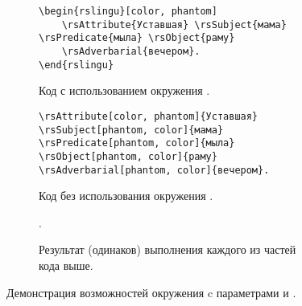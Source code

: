\begin{figure}[htp!]
    \centering
    \begin{subfigure}{\textwidth}
        \begin{verbatim}
\begin{rslingu}[color, phantom]
    \rsAttribute{Уставшая} \rsSubject{мама} \rsPredicate{мыла} \rsObject{раму}
    \rsAdverbarial{вечером}.
\end{rslingu}
        \end{verbatim}
    \caption{Код с использованием окружения .}
    \end{subfigure}\vspace*{.75cm}
    \begin{subfigure}{\textwidth}
        \begin{verbatim}
\rsAttribute[color, phantom]{Уставшая} \rsSubject[phantom, color]{мама}
\rsPredicate[phantom, color]{мыла} \rsObject[phantom, color]{раму}
\rsAdverbarial[phantom, color]{вечером}.
        \end{verbatim}
    \caption{Код без использования окружения .}
    \end{subfigure}\vspace*{.75cm}
    \begin{subfigure}{.9\textwidth}
        \centering
        \begin{rslingu}
                .
        \end{rslingu}
    \caption{Результат (одинаков) выполнения каждого из частей кода выше.}
    \end{subfigure}
    \caption{Демонстрация возможностей окружения  c параметрами  и .}
\end{figure}
